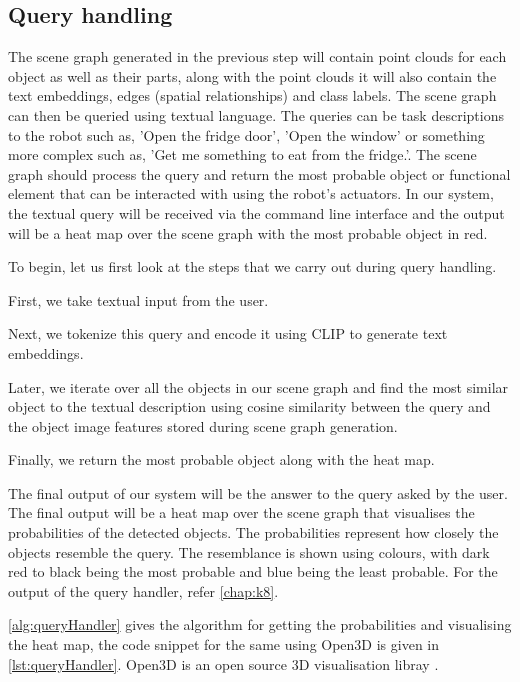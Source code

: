 \subsection{Query handling}
The scene graph generated in the previous step will contain point clouds for each object as well as their parts, along with the point clouds it will
also contain the text embeddings, edges (spatial relationships) and class labels. The scene graph can then be queried using textual language. The queries
can be task descriptions to the robot such as, 'Open the fridge door', 'Open the window' or something more complex such as, 'Get me something to eat 
from the fridge.'. The scene graph should process the query and return the most probable object or functional element that can be interacted with using the
robot's actuators. In our system, the textual query will be received via the command line interface and the output will be a heat map over the scene graph
with the most probable object in red. 

To begin, let us first look at the steps that we carry out during query handling. 
\begin{compactenum}[1.]
\item First, we take textual input from the user. 
\item Next, we tokenize this query and encode it using CLIP to generate text embeddings.
\item Later, we iterate over all the objects in our scene graph and find the most similar object to the textual description using cosine similarity between the query and the object image features stored during scene graph generation.
\item Finally, we return the most probable object along with the heat map.
\end{compactenum}

The final output of our system will be the answer to the query asked by the user. The final output will be a heat map over the scene graph 
that visualises the probabilities of the detected objects. The probabilities represent how closely the objects resemble the query. 
The resemblance is shown using colours, 
with dark red to black being the most probable and blue being the least probable. For the output of the query handler, refer \cref{chap:k8}.

\cref{alg:queryHandler} gives the algorithm for getting the probabilities and visualising the heat map, the code snippet for the same using 
Open3D is given in \cref{lst:queryHandler}. Open3D is an open source 3D visualisation libray \cite{Zhou2018}.

